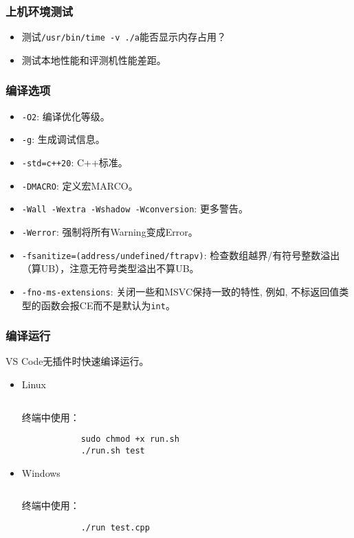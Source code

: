 \documentclass[a4paper, twoside]{article}
\begin{document}
    \subsubsection{上机环境测试}
    \begin{itemize}
        \item 测试\texttt{/usr/bin/time -v ./a}能否显示内存占用？
        \item 测试本地性能和评测机性能差距。
    \end{itemize}

    \subsubsection{编译选项}
    \begin{itemize}
        \item \texttt{-O2}: 编译优化等级。
        \item \texttt{-g}: 生成调试信息。
        \item \texttt{-std=c++20}: C++标准。
        \item \texttt{-DMACRO}: 定义宏MARCO。
        \item \texttt{-Wall -Wextra -Wshadow -Wconversion}: 更多警告。
        \item \texttt{-Werror}: 强制将所有Warning变成Error。
        \item \texttt{-fsanitize=(address/undefined/ftrapv)}: 检查数组越界/有符号整数溢出（算UB），注意无符号类型溢出不算UB。
        \item \texttt{-fno-ms-extensions}: 关闭一些和MSVC保持一致的特性, 例如, 不标返回值类型的函数会报CE而不是默认为\texttt{int}。
    \end{itemize}

    \subsubsection{编译运行}
    VS Code无插件时快速编译运行。
    \begin{itemize}
        \item Linux
        \inputminted{bash}{../src/附录/环境测试/Linux编译运行脚本.sh}
        终端中使用：
        \begin{verbatim}
            sudo chmod +x run.sh
            ./run.sh test        
        \end{verbatim}
        \item Windows
        \inputminted{batch}{../src/附录/环境测试/Windows编译运行脚本.bat}
        终端中使用：
        \begin{verbatim}
            ./run test.cpp     
        \end{verbatim}
    \end{itemize}
\end{document}
